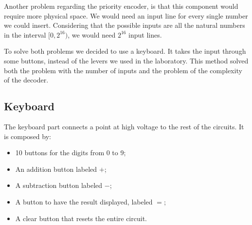 \documentclass{article}
\begin{document}
\vspace{3mm}

Another problem regarding the priority encoder, is that this component would require more physical space. We would need an input line for every single number we could insert. Considering that the possible inputs are all the natural numbers in the interval $[0,2^{16})$, we would need $2^{16}$ input lines.

\vspace{3mm}

To solve both problems we decided to use a keyboard. It takes the input through some buttons, instead of the levers we used in the laboratory. This method solved both the problem with the number of inputs and the problem of the complexity of the decoder.



\subsection{Keyboard}

The keyboard part connects a point at high voltage to the rest of the circuits. It is composed by: 

\begin{itemize}
    \item 10 buttons for the digits from 0 to 9;
    \item An addition button labeled $+$;
    \item A subtraction button labeled $-$;
    \item A button to have the result displayed, labeled $=$;
    \item A clear button that resets the entire circuit.
\end{itemize}
\end{document}

